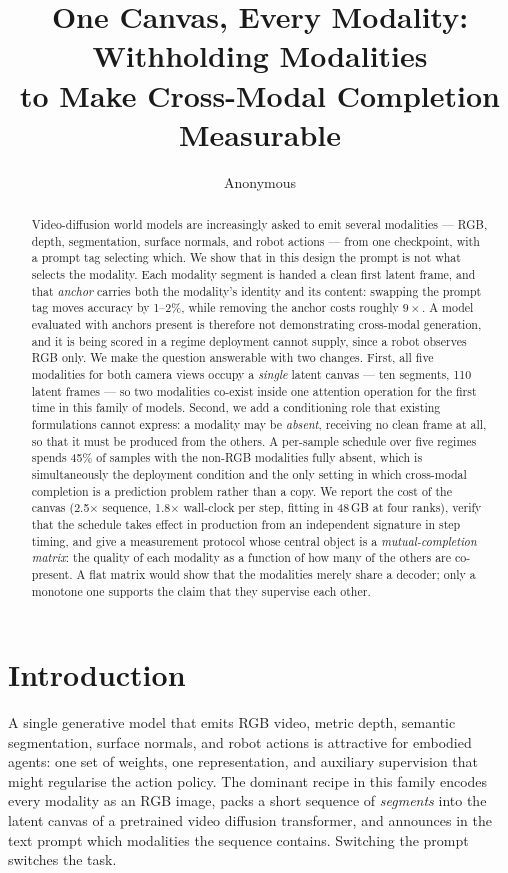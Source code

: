 \documentclass{article}
\title{One Canvas, Every Modality: Withholding Modalities \\ to Make Cross-Modal Completion Measurable}
\author{Anonymous}
\begin{document}
\maketitle

\begin{abstract}
Video-diffusion world models are increasingly asked to emit several modalities --- RGB, depth,
segmentation, surface normals, and robot actions --- from one checkpoint, with a prompt tag
selecting which. We show that in this design the prompt is not what selects the modality. Each
modality segment is handed a clean first latent frame, and that \emph{anchor} carries both the
modality's identity and its content: swapping the prompt tag moves accuracy by 1--2\%, while
removing the anchor costs roughly $9\times$. A model evaluated with anchors present is therefore
not demonstrating cross-modal generation, and it is being scored in a regime deployment cannot
supply, since a robot observes RGB only. We make the question answerable with two changes. First,
all five modalities for both camera views occupy a \emph{single} latent canvas --- ten segments,
110 latent frames --- so two modalities co-exist inside one attention operation for the first
time in this family of models. Second, we add a conditioning role that existing formulations
cannot express: a modality may be \emph{absent}, receiving no clean frame at all, so that it must
be produced from the others. A per-sample schedule over five regimes spends 45\% of samples with
the non-RGB modalities fully absent, which is simultaneously the deployment condition and the
only setting in which cross-modal completion is a prediction problem rather than a copy. We
report the cost of the canvas (2.5$\times$ sequence, 1.8$\times$ wall-clock per step, fitting in
48\,GB at four ranks), verify that the schedule takes effect in production from an independent
signature in step timing, and give a measurement protocol whose central object is a
\emph{mutual-completion matrix}: the quality of each modality as a function of how many of the
others are co-present. A flat matrix would show that the modalities merely share a decoder; only
a monotone one supports the claim that they supervise each other.
\end{abstract}

\section{Introduction}
\label{sec:intro}

A single generative model that emits RGB video, metric depth, semantic segmentation, surface
normals, and robot actions is attractive for embodied agents: one set of weights, one
representation, and auxiliary supervision that might regularise the action policy. The dominant
recipe in this family encodes every modality as an RGB image, packs a short sequence of
\emph{segments} into the latent canvas of a pretrained video diffusion transformer, and announces
in the text prompt which modalities the sequence contains. Switching the prompt switches the
task.
\end{document}
